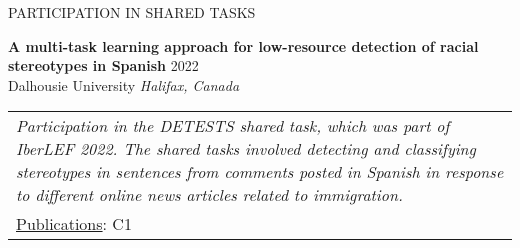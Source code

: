 \documentclass{resume} %
\begin{document}
\begin{rSection}{PARTICIPATION IN SHARED TASKS}
\vspace{-0.1cm}
\item \textbf{A multi-task learning approach for low-resource detection of racial stereotypes in Spanish} \hfill 2022\\
Dalhousie University \hfill \textit{Halifax, Canada}\\
\begin{table}[!ht]
\vspace{-0.7cm}
    \begin{tabular}{|p{\textwidth}}
\textit{Participation in the DETESTS shared task, which was part of IberLEF 2022. The shared tasks involved detecting and classifying stereotypes in sentences from comments posted in Spanish in response to different online news articles related to immigration.}\\
\underline{Publications}: C1
    \end{tabular}\vspace{-0.7cm}
\end{table}

\vspace{-0.1cm}

\end{rSection}
\end{document}
